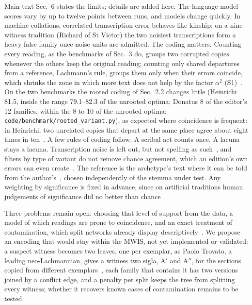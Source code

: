 \documentclass[11pt,a4paper]{article}
\theoremstyle{remark}
\begin{document}
Main-text Sec.~6 states the limits; details are added here. The language-model scores vary by up to twelve points between runs, and models change quickly. In machine collations, correlated transcription error behaves like kinship: on a nine-witness tradition (Richard of St Victor) the two noisiest transcriptions form a heavy false family once noise units are admitted. The coding matters. Counting every reading, as the benchmarks of Sec.~3 do, groups two corrupted copies whenever the others keep the original reading; counting only shared departures from a reference, Lachmann's rule, groups them only when their errors coincide, which shrinks the zone in which more text does not help by the factor $\alpha^2$ (S1)~\citep{StemmaLean}. On the two benchmarks the rooted coding of Sec.~2.2 changes little (Heinrichi 81.5, inside the range 79.1--82.3 of the unrooted optima; Donatus 8 of the editor's 12 families, within the 8 to 10 of the unrooted optima; \texttt{code/benchmark/rooted\_variant.py}), as expected where coincidence is frequent: in Heinrichi, two unrelated copies that depart at the same place agree about eight times in ten~\citep{StemmaMWIS}. A few rules of coding follow. A scribal act counts once. A lacuna stays a lacuna. Transcription noise is left out, but not spelling as such~\citep{AndrewsMace2013}, and filters by type of variant do not remove chance agreement, which an edition's own errors can even create~\citep{Schmid2004}. The reference is the archetype's text where it can be told from the author's~\citep[p.~39]{Reeve2011}, chosen independently of the stemma under test. Any weighting by significance is fixed in advance, since on artificial traditions human judgements of significance did no better than chance~\citep{Andrews2016}.

Three problems remain open: choosing that level of support from the data, a model of which readings are prone to coincidence, and an exact treatment of contamination, which split networks already display descriptively~\citep{BryantMoulton2004,HusonBryant2006}. We propose an encoding that would stay within the MWIS, not yet implemented or validated: a suspect witness becomes two leaves, one per exemplar, as Paolo Trovato, a leading neo-Lachmannian, gives a witness two sigla, A$'$ and A$''$, for the sections copied from different exemplars~\citep[p.~122]{Roelli2020}, each family that contains it has two versions joined by a conflict edge, and a penalty per split keeps the tree from splitting every witness; whether it recovers known cases of contamination remains to be tested.
\end{document}
